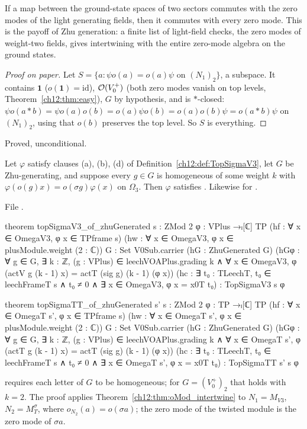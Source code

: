 \begin{physics}
If a map between the ground-state spaces of two sectors commutes with the zero modes of the light generating fields, then it commutes with every zero mode. This is the payoff of Zhu generation: a finite list of light-field checks, the zero modes of weight-two fields, gives intertwining with the entire zero-mode algebra on the ground states.
\end{physics}
\begin{proof}[Proof on paper]
Let $S=\{a : \psi o(a)=o(a)\psi\text{ on }(N_1)_2\}$, a subspace.  It contains $\mathbf 1$ ($o(\mathbf
1)=\mathrm{id}$), $\mathcal{O}(V_0^+)$ (both zero modes vanish on top levels, Theorem~\ref{ch12:thm:easy}),
$G$ by hypothesis, and is $\ast$-closed: $\psi o(a\ast b)=\psi o(a)o(b) = o(a)\psi o(b)=o(a)o(b)\psi=o(a\ast
b)\psi$ on $(N_1)_2$, using that $o(b)$ preserves the top level.  So $S$ is everything.
\end{proof}
\begin{status}Proved, unconditional.\end{status}

\begin{theorem}\label{ch12:thm:topSigmaV3_of_zhuGenerated}
Let $\varphi$ satisfy clauses (a), (b), (d) of Definition~\ref{ch12:def:TopSigmaV3}, let $G$ be
Zhu-generating, and suppose every $g\in G$ is homogeneous of some weight $k$ with
$\varphi(o(g)x)=o(\sigma g)\varphi(x)$ on $\Omega_3$.  Then $\varphi$ satisfies .
Likewise for .
\end{theorem}
File .
\begin{leancode}
theorem topSigmaV3_of_zhuGenerated {s : ZMod 2} {φ : VPlus →ₗ[ℂ] TP}
    (hf : ∀ x ∈ OmegaV3, φ x ∈ TPframe s) (hw : ∀ x ∈ OmegaV3, φ x ∈ plusModule.weight (2 : ℂ))
    {G : Set V0Sub.carrier} (hG : ZhuGenerated G)
    (hGφ : ∀ g ∈ G, ∃ k : ℤ, (g : VPlus) ∈ leechVOAPlus.grading k ∧
      ∀ x ∈ OmegaV3, φ (actV g (k - 1) x) = actT (sig g) (k - 1) (φ x))
    (hc : ∃ t₀ : TLeechT, t₀ ∈ leechFrameT s ∧ t₀ ≠ 0 ∧ ∃ x ∈ OmegaV3, φ x = x0T t₀) :
    TopSigmaV3 s φ

theorem topSigmaTT_of_zhuGenerated {s' s : ZMod 2} {φ : TP →ₗ[ℂ] TP}
    (hf : ∀ x ∈ OmegaT s', φ x ∈ TPframe s) (hw : ∀ x ∈ OmegaT s', φ x ∈ plusModule.weight (2 : ℂ))
    {G : Set V0Sub.carrier} (hG : ZhuGenerated G)
    (hGφ : ∀ g ∈ G, ∃ k : ℤ, (g : VPlus) ∈ leechVOAPlus.grading k ∧
      ∀ x ∈ OmegaT s', φ (actT g (k - 1) x) = actT (sig g) (k - 1) (φ x))
    (hc : ∃ t₀ : TLeechT, t₀ ∈ leechFrameT s ∧ t₀ ≠ 0 ∧ ∃ x ∈ OmegaT s', φ x = x0T t₀) :
    TopSigmaTT s' s φ
\end{leancode}
\begin{dictionary}
 requires each letter of $G$ to be homogeneous; for $G=(V_0^+)_2$ that holds with $k=2$.
The proof applies Theorem~\ref{ch12:thm:oMod_intertwine} to $N_1=M_{V3}$, $N_2=M_T^\sigma$, where
$o_{N_2}(a)=o(\sigma a)$; the zero mode of the twisted module is the zero mode of $\sigma a$.
\end{dictionary}

